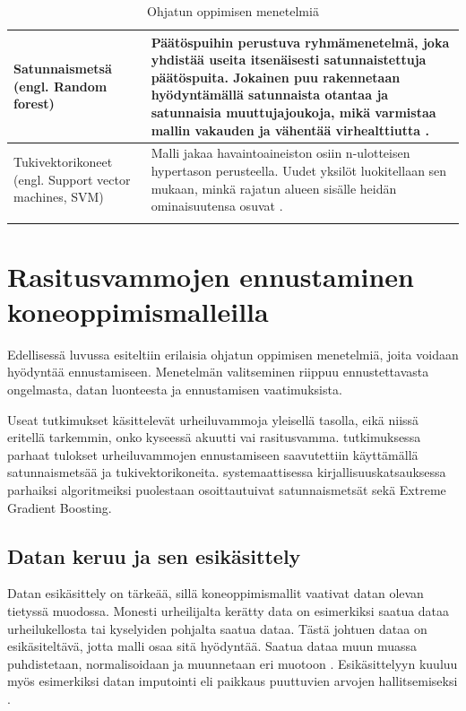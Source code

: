 \documentclass[utf8, bachelor]{gradu3}
\begin{document}
\begin{longtable}{| p{} | p{} |}
Satunnaismetsä (engl. Random forest) & Päätöspuihin perustuva ryhmämenetelmä, joka yhdistää useita itsenäisesti satunnaistettuja päätöspuita. Jokainen puu rakennetaan hyödyntämällä satunnaista otantaa ja satunnaisia muuttujajoukoja, mikä varmistaa mallin vakauden ja vähentää virhealttiutta \parencite{breiman_random_2001}. \\ \hline
Tukivektorikoneet (engl. Support vector machines, SVM) & Malli jakaa havaintoaineiston osiin n-ulotteisen hypertason perusteella. Uudet yksilöt luokitellaan sen mukaan, minkä rajatun alueen sisälle heidän ominaisuutensa osuvat \parencite{black_introduction_2023}.\\ \hline
    \caption{Ohjatun oppimisen menetelmiä} \label{long}\\
\end{longtable}


\chapter{Rasitusvammojen ennustaminen koneoppimismalleilla}

Edellisessä luvussa esiteltiin erilaisia ohjatun oppimisen menetelmiä, joita voidaan hyödyntää ennustamiseen. Menetelmän valitseminen riippuu ennustettavasta ongelmasta, 
datan luonteesta ja ennustamisen vaatimuksista. 

Useat tutkimukset käsittelevät urheiluvammoja yleisellä tasolla, eikä niissä eritellä tarkemmin, onko kyseessä akuutti vai rasitusvamma.
\textcite{murugan_comparison_2025} tutkimuksessa parhaat tulokset urheiluvammojen ennustamiseen saavutettiin käyttämällä satunnaismetsää ja tukivektorikoneita. 
\textcite{leckey_machine_2025} systemaattisessa kirjallisuuskatsauksessa parhaiksi algoritmeiksi puolestaan osoittautuivat satunnaismetsät sekä Extreme Gradient Boosting.

\section{Datan keruu ja sen esikäsittely}

Datan esikäsittely on tärkeää, sillä koneoppimismallit vaativat datan olevan tietyssä muodossa. Monesti urheilijalta kerätty data on esimerkiksi saatua 
dataa urheilukellosta tai kyselyiden pohjalta saatua dataa. Tästä johtuen dataa on esikäsiteltävä, jotta malli osaa sitä hyödyntää. Saatua dataa muun muassa puhdistetaan, 
normalisoidaan ja muunnetaan eri muotoon \parencite{murugan_comparison_2025}. Esikäsittelyyn kuuluu myös esimerkiksi datan imputointi eli paikkaus puuttuvien arvojen 
hallitsemiseksi \parencite{yuan_machine_2026}. 
\end{document}
